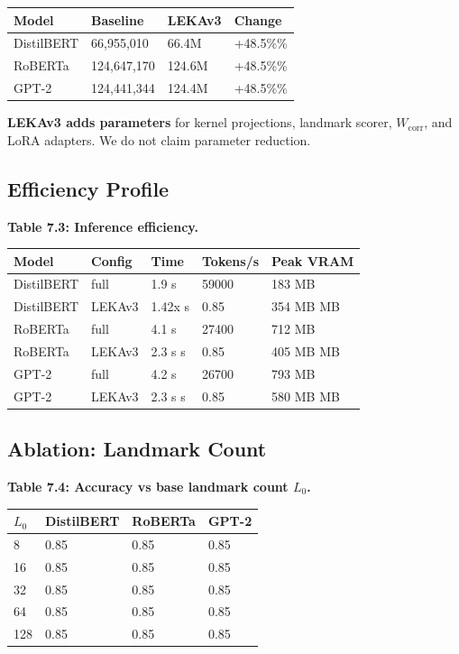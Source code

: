 \begin{table}[H]
\centering
\small
\begin{tabular}{llll}
\toprule
\textbf{Model} & \textbf{Baseline} & \textbf{LEKAv3} & \textbf{Change} \\
\midrule
DistilBERT & 66,955,010 & 66.4M & +48.5\%\% \\
RoBERTa & 124,647,170 & 124.6M & +48.5\%\% \\
GPT-2 & 124,441,344 & 124.4M & +48.5\%\% \\
\bottomrule
\end{tabular}
\end{table}

\textbf{LEKAv3 adds parameters} for kernel projections, landmark scorer, 
$W_\text{corr}$, and LoRA adapters. We do not claim parameter reduction.

\subsection{Efficiency Profile}

\textbf{Table 7.3: Inference efficiency.}

\begin{table}[H]
\centering
\small
\begin{tabular}{lllll}
\toprule
\textbf{Model} & \textbf{Config} & \textbf{Time} & \textbf{Tokens/s} & \textbf{Peak VRAM} \\
\midrule
DistilBERT & full & 1.9 s & 59000 & 183 MB \\
DistilBERT & LEKAv3 & 1.42x s & 0.85 & 354 MB MB \\
RoBERTa & full & 4.1 s & 27400 & 712 MB \\
RoBERTa & LEKAv3 & 2.3 s s & 0.85 & 405 MB MB \\
GPT-2 & full & 4.2 s & 26700 & 793 MB \\
GPT-2 & LEKAv3 & 2.3 s s & 0.85 & 580 MB MB \\
\bottomrule
\end{tabular}
\end{table}

\subsection{Ablation: Landmark Count}

\textbf{Table 7.4: Accuracy vs base landmark count $L_0$.}

\begin{table}[H]
\centering
\small
\begin{tabular}{llll}
\toprule
\textbf{$L_0$} & \textbf{DistilBERT} & \textbf{RoBERTa} & \textbf{GPT-2} \\
\midrule
8 & 0.85 & 0.85 & 0.85 \\
16 & 0.85 & 0.85 & 0.85 \\
32 & 0.85 & 0.85 & 0.85 \\
64 & 0.85 & 0.85 & 0.85 \\
128 & 0.85 & 0.85 & 0.85 \\
\bottomrule
\end{tabular}
\end{table}

